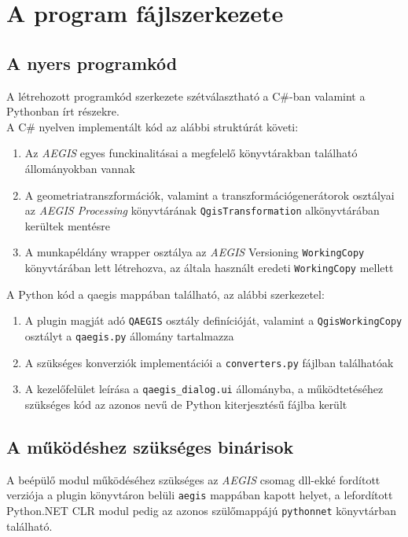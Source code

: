 \section{A program fájlszerkezete}
\subsection{A nyers programkód}
A létrehozott programkód szerkezete szétválasztható a C\#-ban valamint a Pythonban írt részekre.\\
A C\# nyelven implementált kód az alábbi struktúrát követi:
\begin{enumerate}
	\item Az \emph{AEGIS} egyes funckinalitásai a megfelelő könyvtárakban található állományokban vannak
	\item A geometriatranszformációk, valamint a transzformációgenerátorok osztályai az \emph{AEGIS Processing} könyvtárának \texttt{QgisTransformation} alkönyvtárában kerültek mentésre
	\item A munkapéldány wrapper osztálya az \emph{AEGIS} Versioning \texttt{WorkingCopy} könyvtárában lett létrehozva, az általa használt eredeti \texttt{WorkingCopy} mellett 
\end{enumerate}
A Python kód a qaegis mappában található, az alábbi szerkezetel:
\begin{enumerate}
	\item A plugin magját adó \texttt{QAEGIS} osztály definícióját, valamint a \texttt{QgisWorkingCopy} osztályt a \texttt{qaegis.py} állomány tartalmazza
	\item A szükséges konverziók implementációi a \texttt{converters.py} fájlban találhatóak
	\item A kezelőfelület leírása a \texttt{qaegis\_dialog.ui} állományba, a működtetéséhez szükséges kód az azonos nevű de Python kiterjesztésű fájlba került
\end{enumerate}
\subsection{A működéshez szükséges binárisok}
A beépülő modul működéséhez szükséges az \emph{AEGIS} csomag dll-ekké fordított verziója a plugin könyvtáron belüli \texttt{aegis} mappában kapott helyet, a lefordított Python.NET CLR modul pedig az azonos szülőmappájú \texttt{pythonnet} könyvtárban található.


